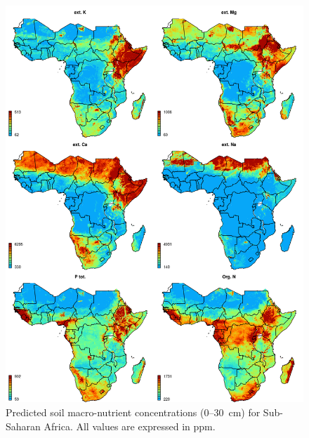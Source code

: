 \begin{linenumbers}
\begin{figure}[!hp]
\includegraphics[width=\textwidth]{Fig_AfNutrients_final_maps_macro.png}
\caption{Predicted soil macro-nutrient concentrations (0--\SI{30}{\centi\metre}) for Sub-Saharan Africa. All values are expressed in ppm.}
\label{fig:final_maps_macro}
\end{figure}

\clearpage


\end{linenumbers}
